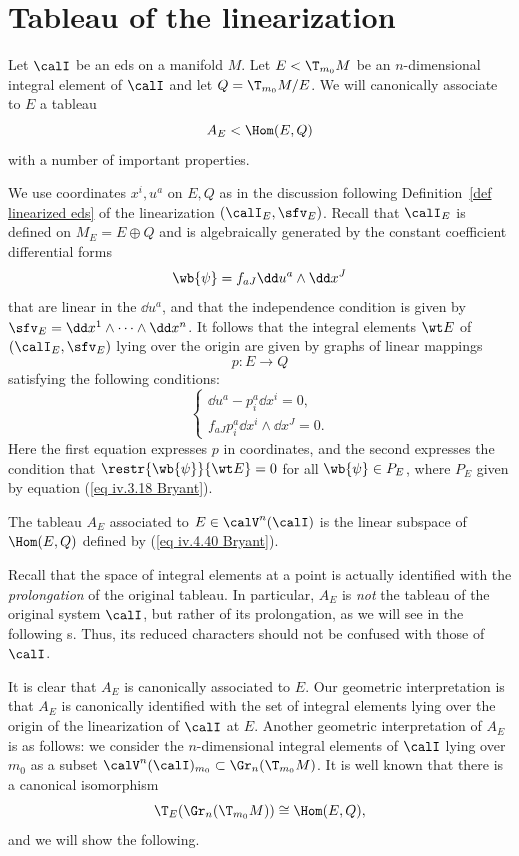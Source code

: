 \section{Tableau of the linearization}\label{sec: tableau of linearized eds}

Let $\calI$ be an \gls{eds} on a manifold $M$. Let $E<\T_{m_0}M$ be an $n$-dimensional integral element of $\calI$ and let $Q=\T_{m_0}M\slash E$. We will canonically associate to $E$ a tableau 
\[A_E<\Hom(E,Q)\]
with a number of important properties. 

We use coordinates $x^i,u^a$ on $E,Q$ as in the discussion following Definition~\ref{def linearized eds} of the linearization $(\calI_E,\sfv_E)$. Recall that $\calI_E$ is defined on $M_E=E\oplus Q$ and is algebraically generated by the constant coefficient differential forms 
\[\wb{\psi}=f_{a J}\dd u^a\wedge\dd x^J\]
that are linear in the $\dd u^a$, and that the independence condition is given by $\sfv_E=\dd x^1\wedge\cdots\wedge\dd x^n$. It follows that the integral elements $\wt E$ of $(\calI_E,\sfv_E)$ lying over the origin are given by graphs of linear mappings 
\[p:E\to Q\]
satisfying the following conditions:
\[\left\{
    \begin{array}{l}
        \dd u^a-p^a_i\dd x^i=0,\\
        f_{a J}p^a_i\dd x^i\wedge\dd x^J=0.
    \end{array}
\right.\label{eq iv.4.40 Bryant}\]
Here the first equation expresses $p$ in coordinates, and the second expresses the condition that $\restr{\wb{\psi}}{\wt E}=0$ for all $\wb{\psi}\in P_E$, where $P_E$ given by equation (\ref{eq iv.3.18 Bryant}).

\begin{defn}
    The tableau $A_E$ associated to $E\in\calV^n(\calI)$ is the linear subspace of $\Hom(E,Q)$ defined by (\ref{eq iv.4.40 Bryant}).
\end{defn}

\begin{rem}
    Recall that the space of integral elements at a point is actually identified with the \emph{prolongation} of the original tableau. In particular, $A_E$ is \emph{not} the tableau of the original system $\calI$, but rather of its prolongation, as we will see in the following \sect s. Thus, its reduced characters should not be confused with those of $\calI$.
\end{rem}

It is clear that $A_E$ is canonically associated to $E$. Our geometric interpretation is that $A_E$ is canonically identified with the set of integral elements lying over the origin of the linearization of $\calI$ at $E$. Another geometric interpretation of $A_E$ is as follows: we consider the $n$-dimensional integral elements of $\calI$ lying over $m_0$ as a subset $\calV^n(\calI)_{m_0}\subset \Gr_n(\T_{m_0} M)$. It is well known that there is a canonical isomorphism 
\[\T_E(\Gr_n(\T_{m_0}M))\cong \Hom(E,Q),\]
and we will show the following.


